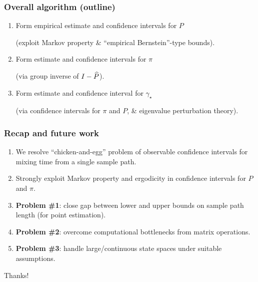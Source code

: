\documentclass[11pt,compress,blue4]{beamer}
\newcommand\fns\footnotesize
\newcommand\gap{\ensuremath{\gamma_{\star}}}
\begin{document}
\begin{frame}
  \frametitle{Overall algorithm (outline)}

  \begin{enumerate}
    \item
      Form empirical estimate and confidence intervals for $P$

      {\fns(exploit Markov property \& ``empirical Bernstein''-type bounds)}.

      \medskip

    \item
      Form estimate and confidence intervals for $\pi$

      {\fns(via group inverse of $I - \widehat P$)}.

      \medskip

    \item
      Form estimate and confidence interval for $\gap$

      {\fns(via confidence intervals for $\pi$ and $P$, \& eigenvalue perturbation theory)}.

  \end{enumerate}
\end{frame}


\begin{frame}
  \frametitle{Recap and future work}

  \begin{enumerate}
    \item
      We resolve ``chicken-and-egg'' problem of observable
      confidence intervals for mixing time from a single sample path.

    \item
      Strongly exploit Markov property and ergodicity in confidence
      intervals for $P$ and $\pi$.

    \item
      \textbf{Problem \#1}:
      close gap between lower and upper bounds on sample path length
      (for point estimation).

    \item
      \textbf{Problem \#2}:
      overcome computational bottlenecks from matrix operations.

    \item
      \textbf{Problem \#3}:
      handle large/continuous state spaces under suitable assumptions.

  \end{enumerate}

\end{frame}


\begin{frame}
  \begin{center}
    \Huge
    Thanks!
  \end{center}
\end{frame}

\end{document}
